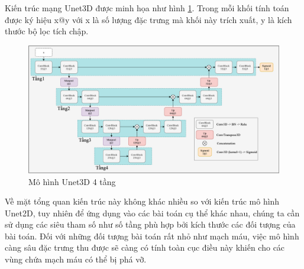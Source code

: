 Kiến trúc mạng Unet3D được minh họa như hình \ref{unet3d_arch}. Trong mỗi khối tính toán được ký hiệu x@y với x là số lượng đặc trưng mà khối này trích xuất, y là kích thước bộ lọc tích chập.

\begin{figure}[H]
    \centering
    \includegraphics[width=14cm]{images/blood/model-Unet3D.png}
    \caption{Mô hình Unet3D 4 tầng}
    \label{unet3d_arch}
\end{figure}

Về mặt tổng quan kiến trúc này không khác nhiều so với kiến trúc mô hình Unet2D, tuy nhiên để ứng dụng vào các bài toán cụ thể khác nhau, chúng ta cần sử dụng các siêu tham số như số tầng phù hợp bởi kích thước các đối tượng của bài toán. Đối với những đối tượng bài toán rất nhỏ như mạch máu, việc mô hình càng sâu đặc trưng thu được sẽ càng có tính toàn cục điều này khiến cho các vùng chứa mạch máu có thể bị phá vỡ.\par


